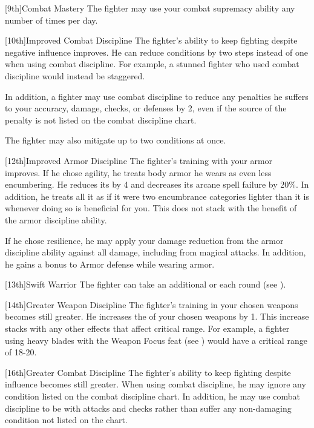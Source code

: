         [9th]{Combat Mastery}
        The fighter may use your combat supremacy ability any number of times per day.

        [10th]{Improved Combat Discipline}
        The fighter's ability to keep fighting despite negative influence improves.
        He can reduce conditions by two steps instead of one when using combat discipline.
        For example, a stunned fighter who used combat discipline would instead be staggered.
        \par In addition, a fighter may use combat discipline to reduce any penalties he suffers to your accuracy, damage, checks, or defenses by 2, even if the source of the penalty is not listed on the combat discipline chart.
        \par The fighter may also mitigate up to two conditions at once.

        [12th]{Improved Armor Discipline}
        The fighter's training with your armor improves.
        If he chose agility, he treats body armor he wears as even less encumbering.
        He reduces its  by 4 and decreases its arcane spell failure by 20\%.
        In addition, he treats all it as if it were two encumbrance categories lighter than it is whenever doing so is beneficial for you.
        This does not stack with the benefit of the armor discipline ability.

        If he chose resilience, he may apply your damage reduction from the armor discipline ability against all damage, including from magical attacks.
        In addition, he gains a  bonus to Armor defense while wearing armor.

        [13th]{Swift Warrior}
        The fighter can take an additional  or  each round (see ).

        [14th]{Greater Weapon Discipline}
        The fighter's training in your chosen weapons becomes still greater.
        He increases the  of your chosen weapons by 1.
        This increase stacks with any other effects that affect critical range.
        For example, a fighter using heavy blades with the Weapon Focus feat (see ) would have a critical range of 18-20.

        [16th]{Greater Combat Discipline}
        The fighter's ability to keep fighting despite influence becomes still greater.
        When using combat discipline, he may ignore any condition listed on the combat discipline chart.
        In addition, he may use combat discipline to be \severelyimpaired with attacks and checks rather than suffer any non-damaging condition not listed on the chart.

